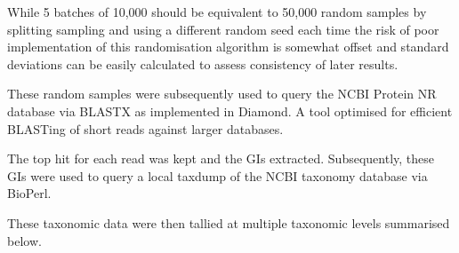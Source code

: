 While 5 batches of 10,000 should be equivalent to 50,000 random samples by splitting sampling and using
a different random seed each time the risk of poor implementation of this randomisation algorithm is 
somewhat offset and standard deviations can be easily calculated to assess consistency of later results.

These random samples were subsequently used to query the NCBI Protein NR database via BLASTX as implemented
in Diamond.  A tool optimised for efficient BLASTing of short reads against larger databases.

The top hit for each read was kept and the GIs extracted.  Subsequently, these GIs were used to query
a local taxdump of the NCBI taxonomy database via BioPerl.

These taxonomic data were then tallied at multiple taxonomic levels summarised below.




